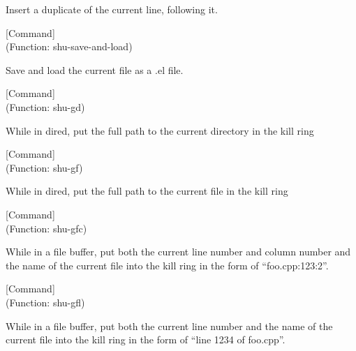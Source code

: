 \begin{doc-string}
Insert a duplicate of the current line, following it.
\end{doc-string}

\vspace{1em}
\noindent
{}
\usebox{\funcname}
 \hfill [Command]\\%
 (Function: shu-save-and-load)

\begin{doc-string}
Save and load the current file as a .el file.
\end{doc-string}

\vspace{1em}
\noindent
{}
\usebox{\funcname}
 \hfill [Command]\\%
 (Function: shu-gd)

\begin{doc-string}
While in dired, put the full path to the current directory in the kill ring
\end{doc-string}

\vspace{1em}
\noindent
{}
\usebox{\funcname}
 \hfill [Command]\\%
 (Function: shu-gf)

\begin{doc-string}
While in dired, put the full path to the current file in the kill ring
\end{doc-string}

\vspace{1em}
\noindent
{}
\usebox{\funcname}
 \hfill [Command]\\%
 (Function: shu-gfc)

\begin{doc-string}
While in a file buffer, put both the current line number and
column number and the name of the current file into the kill ring
in the form of ``foo.cpp:123:2''.
\end{doc-string}

\vspace{1em}
\noindent
{}
\usebox{\funcname}
 \hfill [Command]\\%
 (Function: shu-gfl)

\begin{doc-string}
While in a file buffer, put both the current line number and the name of the current
file into the kill ring in the form of ``line 1234 of foo.cpp''.
\end{doc-string}

